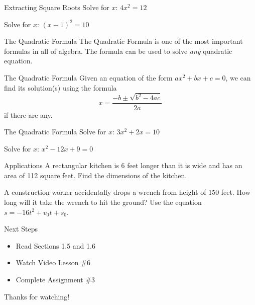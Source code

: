 \documentclass{beamer}
\begin{document}
\begin{frame}[t]{Extracting Square Roots}
Solve for $x$: $4x^2 = 12$

\vfill \pause

Solve for $x$: $(x-1)^2 = 10$

\end{frame}

\begin{frame}[t]{The Quadratic Formula}
The Quadratic Formula is one of the most important formulas in all of algebra. The formula can be used to solve \textit{any} quadratic equation.

\pause

\begin{block}{The Quadratic Formula}
Given an equation of the form $ax^2 + bx + c = 0$, we can find its solution(s) using the formula $$x = \dfrac{-b\pm\sqrt{b^2 - 4ac}}{2a}$$ if there are any.
\end{block}
\end{frame}

\begin{frame}[t]{The Quadratic Formula}
Solve for $x$: $3x^2 + 2x = 10$

\vfill \pause

Solve for $x$: $x^2 - 12x + 9 = 0$

\end{frame}

\begin{frame}[t]{Applications}
A rectangular kitchen is 6 feet longer than it is wide and has an area of 112 square feet. Find the dimensions of the kitchen.

\vfill \pause

A construction worker accidentally drops a wrench from height of 150 feet. How long will it take the wrench to hit the ground? Use the equation $s = -16t^2 + v_0 t + s_0$.

\end{frame}

\begin{frame}[t]{Next Steps}
\begin{itemize}
\item Read Sections 1.5 and 1.6
\item Watch Video Lesson \#6
\item Complete Assignment \#3
\end{itemize}

\vfill

Thanks for watching!

\end{frame}
\end{document}
